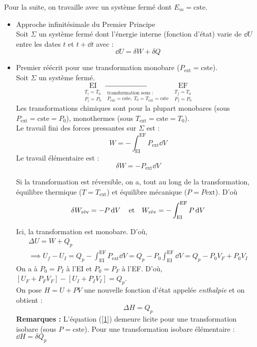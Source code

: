 \documentclass{article}
\let\oldref\ref
\renewcommand{\ref}[1]{(\oldref{#1})}
\newcommand{\ext}{\text{ext}}
\newcommand{\cste}{\text{cste}}
\newcommand{\EI}{\mathrm{EI}}
\newcommand{\EF}{\mathrm{EF}}
\newcommand{\rev}{\text{rév}}
\begin{document}
    \begin{tableau}
        Pour la suite, on travaille avec un système fermé dont $E_m=\cste$.
        \begin{itemize}
            \item Approche infinitésimale du Premier Principe\\
            Soit $\Sigma$ un système fermé dont l'énergie interne (fonction d'état) varie de $\dd{U}$ entre les dates $t$ et $t+\dd{t}$ avec :
            $$\dd{U} = \delta W+\delta Q$$
            \item Premier réécrit pour une transformation monobare ($P_\ext = \cste$).\\
            Soit $\Sigma$ un système fermé.
            $$\underset{\substack{T_i=T_0\\P_i=P_0}}{\EI} \xrightarrow[\substack{\text{transformation sous :}\\P_\ext=\cste,\ T_0=T_\ext = \cste}]{} \underset{\substack{T_f=T_0\\P_f=P_0}}{\EF}$$
            Les transformations chimiques sont pour la plupart monobares (sous $P_\ext =\cste = P_0$), monothermes (sous $T_\ext =\cste = T_0$).\\
            
            Le travail fini des forces pressantes sur $\Sigma$ est :
            $$W=-\int_{\EI}^{\EF} P_\ext \dd{V}$$
            Le travail élémentaire est :
            $$\delta W = -P_\ext \dd{V}$$
            \begin{remarque}
                Si la transformation est réversible, on a, tout au long de la transformation, équilibre thermique ($T=T_\ext$) et équilibre mécanique ($P=P\ext$). D'où\\
            $$\delta W_\rev = -P\dd{V} \qq{et} W_\rev = -\int_\EI^\EF P\dd{V}$$
            \end{remarque}
            Ici, la transformation est monobare. D'où,
            \begin{gather*}
                \Delta U = W + Q_p\\
                \implies U_f-U_I = Q_p - \int_\EI^\EF P_\ext \dd{V} =  Q_p - P_0\int_\EI^\EF \dd{V} = Q_p -P_0V_F + P_0V_I
            \end{gather*}
            On a à $P_0 = P_I$ à l'EI et $P_0 = P_F$ à l'EF. D'où, $[U_F + P_FV_F]-[U_I + P_IV_I] = Q_p$.\\
            On pose $H = U+PV$ une nouvelle fonction d'état appelée \textit{enthalpie} et on obtient :
            \begin{equation}\label{1}
                \Delta H = Q_p
            \end{equation}
            \textbf{Remarques :} L'équation \ref{1} demeure licite pour une transformation isobare (sous $P=\cste$). Pour une transformation isobare élémentaire : $\dd{H} = \delta Q_p$
        \end{itemize}
    \end{tableau}
    
\end{document}
